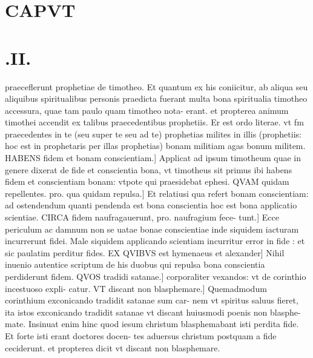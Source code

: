 \documentclass{article}
\begin{document}
\begin{pages}
\section*{CAPVT }
\section*{.II. }\pstart praeceflerunt prophetiae de timotheo. Et quantum ex his coniicitur, ab aliqua seu aliquibus spiritualibus personis praedicta fuerant multa bona spiritualia timotheo accessura, quae tam paulo quam timotheo nota- erant. et propterea animum timothei accendit ex talibus praecedentibus prophetiis. Er est ordo literae. vt fm praecedentes in te (seu super te seu ad te) prophetias milites in illis (prophetiis: hoc est in prophetaris per illas prophetias) bonam militiam agas bonum militem. HABENS fidem et bonam conscientiam.] Applicat ad ipsum timotheum quae in genere dixerat de fide et conscientia bona, vt timotheus sit primus ibi habens fidem et conscientiam bonam: vtpote qui praesidebat ephesi. QVAM quidam repellentes. pro. qua quidam repulsa.] Et relatiusi qua refert bonam conscientiam: ad ostendendum quanti pendenda est bona conscientia hoc est bona applicatio scientiae. CIRCA fidem naufragauerunt, pro. naufragium fece- tunt.] Ecce periculum ac damnum non se uatae bonae conscientiae inde siquidem iacturam incurrerunt fidei. Male siquidem applicando scientiam incurritur error in fide : et sic paulatim perditur fides. EX QVIBVS est hymenaeus et alexander] Nihil inuenio autentice scriptum de his duobus qui repulsa bona conscientia perdiderunt fidem. QVOS tradidi satanae.] corporaliter vexandos: vt de corinthio incestuoso expli- catur. VT discant non blasphemare.] Quemadmodum corinthium exconicando tradidit satanae sum car- nem vt spiritus saluus fieret, ita istos exconicando tradidit satanae vt discant huiusmodi poenis non blasphe- mate. Insinuat enim hinc quod iesum christum blasphemabant isti perdita fide. Et forte isti erant doctores docen- tes aduersus christum postquam a fide ceciderunt. et propterea dicit vt discant non blasphemare.  \pend

\end{pages}
\end{document}
